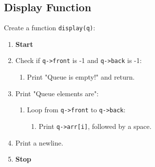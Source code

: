 {  \subsection{Display Function}
  Create a function \texttt{display(q)}:
  \begin{enumerate}[label=\arabic*:,left=0pt]
    \item \textbf{Start}
    \item Check if \texttt{q->front} is -1 and \texttt{q->back} is -1:
          \begin{enumerate}[label=2.\arabic*.]
            \item Print "Queue is empty!" and return.
          \end{enumerate}
    \item Print "Queue elements are":
          \begin{enumerate}[label=2.\arabic*.]
            \item Loop from \texttt{q->front} to \texttt{q->back}:
                  \begin{enumerate}[label=2.1.\arabic*.]
                    \item Print \texttt{q->arr[i]}, followed by a space.
                  \end{enumerate}
          \end{enumerate}
    \item Print a newline.
    \item \textbf{Stop}
  \end{enumerate}

}

